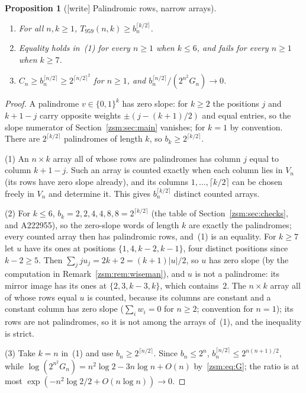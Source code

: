 \documentclass[11pt]{article}
\newtheorem{proposition}[theorem]{Proposition}
\theoremstyle{definition}\newtheorem{definition}[theorem]{Definition}
\theoremstyle{remark}\newtheorem{remark}[theorem]{Remark}
\begin{document}
\begin{proposition}[{[write]} Palindromic rows, narrow arrays]\label{zsm:prop:narrow}
\begin{enumerate}
\item[(1)] For all $n,k\ge1$, $T_{959}(n,k)\ge b_n^{\lceil k/2\rceil}$.
\item[(2)] Equality holds in~(1) for every $n\ge1$ when $k\le6$, and fails
 for every $n\ge1$ when $k\ge7$.
\item[(3)] $C_n\ge b_n^{\lceil n/2\rceil}\ge2^{\lceil n/2\rceil^2}$ for
 $n\ge1$, and $b_n^{\lceil n/2\rceil}/(2^{n^2}G_n)\to0$.
\end{enumerate}
\end{proposition}
\begin{proof}
A palindrome $v\in\{0,1\}^k$ has zero slope: for $k\ge2$ the positions $j$
and $k+1-j$ carry opposite weights $\pm(j-(k+1)/2)$ and equal entries, so
the slope numerator of Section~\ref{zsm:sec:main} vanishes; for $k=1$ by
convention. There are $2^{\lceil k/2\rceil}$ palindromes of length $k$, so
$b_k\ge2^{\lceil k/2\rceil}$.

(1) An $n\times k$ array all of whose rows are palindromes has column $j$
equal to column $k+1-j$. Such an array is counted exactly when each column
lies in $V_n$ (its rows have zero slope already), and its columns
$1,\dots,\lceil k/2\rceil$ can be chosen freely in $V_n$ and determine it.
This gives $b_n^{\lceil k/2\rceil}$ distinct counted arrays.

(2) For $k\le6$, $b_k=2,2,4,4,8,8=2^{\lceil k/2\rceil}$ (the table of
Section~\ref{zsm:sec:checks}, and A222955), so the zero-slope words of
length $k$ are exactly the palindromes; every counted array then has
palindromic rows, and~(1) is an equality. For $k\ge7$ let $u$ have its ones
at positions $\{1,4,k-2,k-1\}$, four distinct positions since $k-2\ge5$.
Then $\sum_jju_j=2k+2=(k+1)|u|/2$, so $u$ has zero slope (by the
computation in Remark~\ref{zsm:rem:wiseman}), and $u$ is not a palindrome:
its mirror image has its ones at $\{2,3,k-3,k\}$, which contains~$2$. The
$n\times k$ array all of whose rows equal $u$ is counted, because its
columns are constant and a constant column has zero slope ($\sum_iw_i=0$
for $n\ge2$; convention for $n=1$); its rows are not palindromes, so it is
not among the arrays of~(1), and the inequality is strict.

(3) Take $k=n$ in~(1) and use $b_n\ge2^{\lceil n/2\rceil}$. Since
$b_n\le2^n$, $b_n^{\lceil n/2\rceil}\le2^{n(n+1)/2}$, while
$\log(2^{n^2}G_n)=n^2\log2-3n\log n+O(n)$ by~\eqref{zsm:eq:G}; the ratio is at
most $\exp(-n^2\log2/2+O(n\log n))\to0$.
\end{proof}
\end{document}

